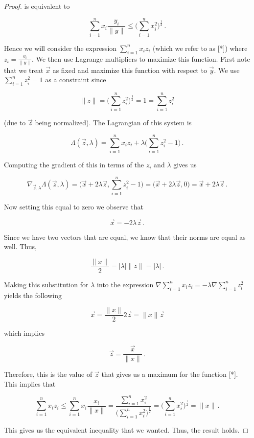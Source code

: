 \documentclass[a4paper]{article}
\numberwithin{equation}{section}
\begin{document}
\begin{description}
\begin{proof}
is equivalent to 

$$\sum_{i=1}^nx_i\frac{y_i}{\|y\|} \leq \Big(\sum_{i=1}^n x_i^2\Big)^{\frac{1}{2}}\,.$$

Hence we will consider the expression $\sum_{i=1}^nx_iz_i$ (which we refer to as [*]) where $z_i = \frac{y_i}{\|y\|}$. We then use Lagrange multipliers to maximize this function. First note that we treat $\vec{x}$ as fixed and maximize this function with respect to $\vec{y}$. We use $\sum_{i=1}^nz_i^2 = 1$ as a constraint since

$$\|z\| = \Big(\sum_{i=1}^nz_i^2\Big)^{\frac{1}{2}} = 1 = \sum_{i=1}^nz_i^2$$

(due to $\vec{z}$ being normalized). The Lagrangian of this system is 

$$\Lambda(\vec{z},\lambda) = \sum_{i=1}^nx_iz_i + \lambda\Big(\sum_{i=1}^nz_i^2 - 1\Big)\,.$$

Computing the gradient of this in terms of the $z_i$ and $\lambda$ gives us

$$\nabla_{\vec{z},\lambda}\Lambda(\vec{z},\lambda) =\Big( \vec{x} + 2\lambda\vec{z}, \sum_{i=1}^nz_i^2 - 1\Big) = \Big( \vec{x} + 2\lambda\vec{z}, 0\Big) = \vec{x} + 2\lambda\vec{z}\,.$$

Now setting this equal to zero we observe that

$$\vec{x} = -2\lambda\vec{z}\,.$$

Since we have two vectors that are equal, we know that their norms are equal as well. Thus,

$$\frac{\|x\|}{2} = |\lambda|\|z\| = |\lambda|\,.$$

Making this substitution for $\lambda$ into the expression $\nabla\sum_{i=1}^nx_iz_i = -\lambda\nabla\sum_{i=1}^nz_i^2$ yields the following

$$\vec{x} = \frac{\|x\|}{2}2\vec{z} = \|x\|\vec{z}$$

which implies

$$\vec{z} = \frac{\vec{x}}{\|x\|}\,.$$

Therefore, this is the value of $\vec{z}$ that gives us a maximum for the function [*]. This implies that

$$\sum_{i=1}^nx_iz_i \leq \sum_{i=1}^nx_i\frac{x_i}{\|x\|} = \frac{\sum_{i=1}^nx_i^2}{\big(\sum_{i=1}^nx_i^2\big)^\frac{1}{2}} = \Big(\sum_{i=1}^nx_i^2\Big)^\frac{1}{2} = \|x\|\,.$$

This gives us the equivalent inequality that we wanted. Thus, the result holds.

\end{proof}

\end{description}
\end{document}
